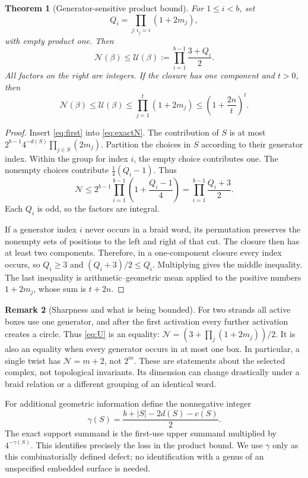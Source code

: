 \documentclass[11pt,letterpaper]{article}
\newtheorem{theorem}{Theorem}[section]
\theoremstyle{definition}
\newtheorem{remark}[theorem]{Remark}
\newcommand{\N}{\mathcal N}
\newcommand{\U}{\mathcal U}
\begin{document}
\begin{theorem}[Generator-sensitive product bound]\label{thm:generator}
For \(1\leq i<b\), set
\[
 Q_i=\prod_{j:i_j=i}(1+2m_j),
\]
with empty product one. Then
\begin{equation}\label{eq:U}
 \N(\beta)\leq\U(\beta):=\prod_{i=1}^{b-1}\frac{3+Q_i}{2}.
\end{equation}
All factors on the right are integers. If the closure has one component and \(t>0\), then
\begin{equation}\label{eq:AMGM}
 \N(\beta)\leq\U(\beta)
 \leq\prod_{j=1}^t(1+2m_j)
 \leq\left(1+\frac{2n}{t}\right)^t.
\end{equation}
\end{theorem}
\begin{proof}
Insert \cref{eq:first} into \cref{eq:exactN}. The contribution of \(S\) is at most
\(2^{b-1}4^{-d(S)}\prod_{j\in S}(2m_j)\).
Partition the choices in \(S\) according to their generator index. Within the group for index \(i\), the empty choice contributes one. The nonempty choices contribute
\(\frac14(Q_i-1)\). Thus
\[
 \N\leq2^{b-1}\prod_{i=1}^{b-1}\left(1+\frac{Q_i-1}{4}\right)
      =\prod_{i=1}^{b-1}\frac{Q_i+3}{2}.
\]
Each \(Q_i\) is odd, so the factors are integral.

If a generator index \(i\) never occurs in a braid word, its permutation preserves the nonempty sets of positions to the left and right of that cut. The closure then has at least two components. Therefore, in a one-component closure every index occurs, so \(Q_i\geq3\) and
\((Q_i+3)/2\leq Q_i\). Multiplying gives the middle inequality. The last inequality is arithmetic--geometric mean applied to the positive numbers \(1+2m_j\), whose sum is \(t+2n\).
\end{proof}

\begin{remark}[Sharpness and what is being bounded]
For two strands all active boxes use one generator, and after the first activation every further activation creates a circle. Thus \cref{eq:U} is an equality:
\(\N=(3+\prod_j(1+2m_j))/2\).
It is also an equality when every generator occurs in at most one box. In particular, a single twist has \(\N=m+2\), not \(2^{m}\).
These are statements about the selected complex, not topological invariants. Its dimension can change drastically under a braid relation or a different grouping of an identical word.
\end{remark}

For additional geometric information define the nonnegative integer
\[
 \gamma(S)=\frac{b+|S|-2d(S)-c(S)}2.
\]
The exact support summand is the first-use upper summand multiplied by \(4^{-\gamma(S)}\). This identifies precisely the loss in the product bound. We use \(\gamma\) only as this combinatorially defined defect; no identification with a genus of an unspecified embedded surface is needed.
\end{document}

